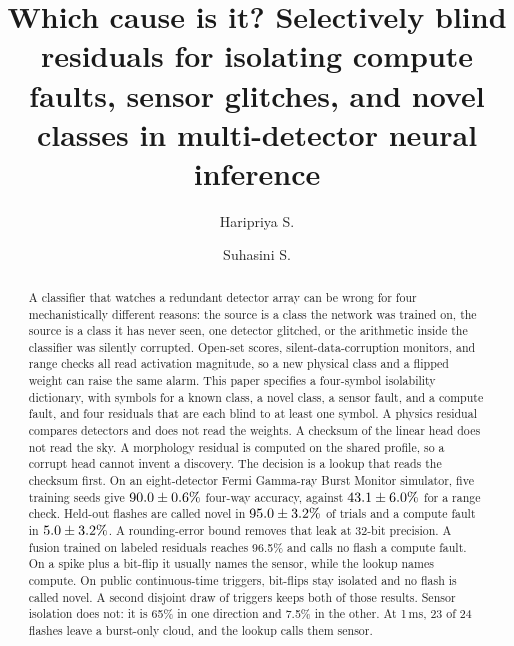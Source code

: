 \documentclass[preprint,12pt]{elsarticle}
\begin{document}
\begin{frontmatter}

\title{Which cause is it? Selectively blind residuals for isolating compute faults, sensor glitches, and novel classes in multi-detector neural inference}

\author[cse]{Haripriya S.}
\author[ece]{Suhasini S.}

\begin{abstract}
A classifier that watches a redundant detector array can be wrong for four mechanistically different reasons: the source is a class the network was trained on, the source is a class it has never seen, one detector glitched, or the arithmetic inside the classifier was silently corrupted. Open-set scores, silent-data-corruption monitors, and range checks all read activation magnitude, so a new physical class and a flipped weight can raise the same alarm. This paper specifies a four-symbol isolability dictionary, with symbols for a known class, a novel class, a sensor fault, and a compute fault, and four residuals that are each blind to at least one symbol. A physics residual compares detectors and does not read the weights. A checksum of the linear head does not read the sky. A morphology residual is computed on the shared profile, so a corrupt head cannot invent a discovery. The decision is a lookup that reads the checksum first. On an eight-detector Fermi Gamma-ray Burst Monitor simulator, five training seeds give $90.0\pm0.6\%$ four-way accuracy, against $43.1\pm6.0\%$ for a range check. Held-out flashes are called novel in $95.0\pm3.2\%$ of trials and a compute fault in $5.0\pm3.2\%$. A rounding-error bound removes that leak at 32-bit precision. A fusion trained on labeled residuals reaches 96.5\% and calls no flash a compute fault. On a spike plus a bit-flip it usually names the sensor, while the lookup names compute. On \RealCubes{} public continuous-time triggers, bit-flips stay isolated and no flash is called novel. A second disjoint draw of \RealCubes{} triggers keeps both of those results. Sensor isolation does not: it is 65\% in one direction and 7.5\% in the other. At 1\,ms, 23 of 24 flashes leave a burst-only cloud, and the lookup calls them sensor.
\end{abstract}


\end{frontmatter}
\end{document}
